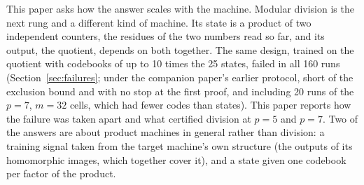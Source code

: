 \documentclass[11pt]{article}
\begin{document}
This paper asks how the answer scales with the machine. Modular division is the next rung and a
different kind of machine. Its state is a product of two
independent counters, the residues of the two numbers read so far, and its output, the quotient,
depends on both together. The same design, trained on the quotient with codebooks of up to 10 times
the 25 states, failed in all 160 runs (Section~\ref{sec:failures}; under the companion paper's
earlier protocol, short of the exclusion bound and with no stop at the first proof, and including 20
runs of the $p = 7$, $m = 32$ cells, which had fewer codes than states). This paper reports how the
failure was taken apart and what certified division at $p = 5$ and $p = 7$. Two of the answers
are about product machines in general rather than division: a training signal taken from the
target machine's own structure (the outputs of its homomorphic images, which together cover it),
and a state given one codebook per factor of the product.
\end{document}
